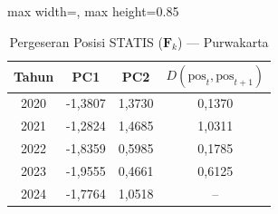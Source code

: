 \begin{table}[H]
\centering
\caption{Pergeseran Posisi STATIS ($\mathbf{F}_k$) --- Purwakarta} \label{tab:app1jarak_statis_skor_purwakarta}
\begin{adjustbox}{max width=\textwidth, max height=0.85\textheight}
\begin{tabular}{|c|c|c|c|}
\hline
\textbf{Tahun} & \textbf{PC1} & \textbf{PC2} & \textbf{$D(\text{pos}_t, \text{pos}_{t+1})$} \\
\hline
2020 & -1,3807 & 1,3730 & 0,1370 \\
2021 & -1,2824 & 1,4685 & 1,0311 \\
2022 & -1,8359 & 0,5985 & 0,1785 \\
2023 & -1,9555 & 0,4661 & 0,6125 \\
2024 & -1,7764 & 1,0518 & -- \\
\hline
\end{tabular}
\end{adjustbox}
\end{table}